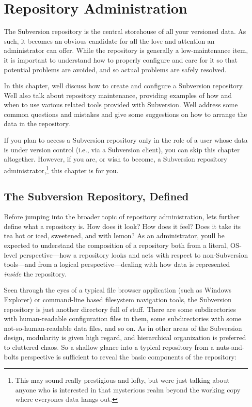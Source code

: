 \chapter{Repository Administration}\label{svn.reposadmin}

The Subversion repository is the central storehouse of all your
versioned data. As such, it becomes an obvious candidate for all the
love and attention an administrator can offer. While the repository is
generally a low-maintenance item, it is important to understand how to
properly configure and care for it so that potential problems are
avoided, and so actual problems are safely resolved.

In this chapter, we\textquotesingle ll discuss how to create and
configure a Subversion repository. We\textquotesingle ll also talk about
repository maintenance, providing examples of how and when to use
various related tools provided with Subversion. We\textquotesingle ll
address some common questions and mistakes and give some suggestions on
how to arrange the data in the repository.

If you plan to access a Subversion repository only in the role of a user
whose data is under version control (i.e., via a Subversion client), you
can skip this chapter altogether. However, if you are, or wish to
become, a Subversion repository administrator,\footnote{This may sound
  really prestigious and lofty, but we\textquotesingle re just talking
  about anyone who is interested in that mysterious realm beyond the
  working copy where everyone\textquotesingle s data hangs out.} this
chapter is for you.

\section{The Subversion Repository,
Defined}\label{svn.reposadmin.basics}

Before jumping into the broader topic of repository administration,
let\textquotesingle s further define what a repository is. How does it
look? How does it feel? Does it take its tea hot or iced, sweetened, and
with lemon? As an administrator, you\textquotesingle ll be expected to
understand the composition of a repository both from a literal, OS-level
perspective---how a repository looks and acts with respect to
non-Subversion tools---and from a logical perspective---dealing with how
data is represented \emph{inside} the repository.

Seen through the eyes of a typical file browser application (such as
Windows Explorer) or command-line based filesystem navigation tools, the
Subversion repository is just another directory full of stuff. There are
some subdirectories with human-readable configuration files in them,
some subdirectories with some not-so-human-readable data files, and so
on. As in other areas of the Subversion design, modularity is given high
regard, and hierarchical organization is preferred to cluttered chaos.
So a shallow glance into a typical repository from a nuts-and-bolts
perspective is sufficient to reveal the basic components of the
repository:

